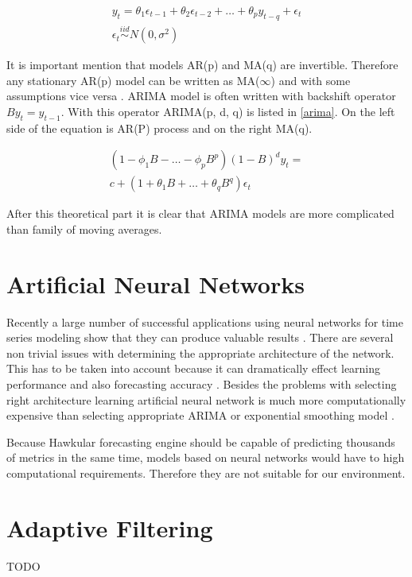     \begin{eqnarray} \label{ma_model}
        y_t = \theta_1 \epsilon_{t-1} + \theta_2 \epsilon_{t-2} + \dots + \theta_p y_{t-q} + \epsilon_t \\ \nonumber
        \epsilon_t \overset{iid}{\sim} N(0, \sigma^2)
    \end{eqnarray}

    It is important mention that models AR(p) and MA(q) are invertible.
    Therefore any stationary AR(p) model can be written as MA($\infty$) and with some assumptions
    vice versa \cite{brockwell}. ARIMA model is often written with backshift operator $By_t=y_{t-1}$.
    With this operator ARIMA(p, d, q) is listed in \ref{arima}. On the left side of the equation is AR(P) process
    and on the right MA(q).

    \begin{eqnarray} \label{arima}
        (1- \phi_1B - \dots - \phi_pB^p)(1-B)^d y_t = \\ \nonumber
         c + (1+\theta_1B+\dots+\theta_qB^q) \epsilon_t
    \end{eqnarray}

    After this theoretical part it is clear that ARIMA models are more complicated than family of moving averages.

    \section{Artificial Neural Networks}
    Recently a large number of successful applications using neural networks for time series modeling show that they
    can produce valuable results \cite{ann-forecasting-state-art}. There are several non trivial issues with
    determining the appropriate architecture of the network. This has to be taken into account because it can
    dramatically effect learning performance and also forecasting accuracy \cite{ann-model-selecting}.
    Besides the problems with selecting right architecture learning artificial neural network is much more
    computationally expensive than selecting appropriate ARIMA or exponential smoothing model \cite{ann-forecasting}.

    Because Hawkular forecasting engine should be capable of predicting thousands of metrics in the same time, models
    based on neural networks would have to high computational requirements. Therefore they are not suitable for our
    environment.

    \section{Adaptive Filtering}
    TODO

